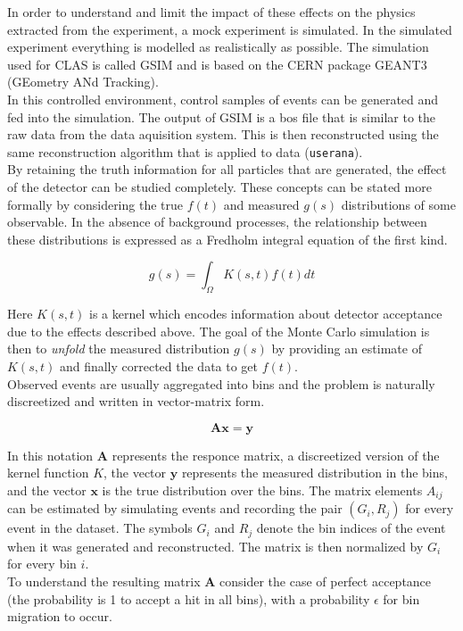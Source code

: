 In order to understand and limit the impact of these effects on the physics extracted from the experiment, a mock experiment is simulated.  In the simulated experiment everything is modelled as realistically as possible.  The simulation used for CLAS is called GSIM and is based on the CERN package GEANT3 (GEometry ANd Tracking).\\
In this controlled environment, control samples of events can be generated and fed into the simulation.  The output of GSIM is a bos file that is similar to the raw data from the data aquisition system. This is then reconstructed using the same reconstruction algorithm that is applied to data (\texttt{userana}).  \\ 
By retaining the truth information for all particles that are generated, the effect of the detector can be studied completely.  These concepts can be stated more formally by considering the true $f(t)$ and measured $g(s)$ distributions of some observable.  In the absence of background processes, the relationship between these distributions is expressed as a Fredholm integral equation of the first kind.

\begin{equation}
	g(s) = \int_{\Omega} K(s,t) f(t) dt
\end{equation}
    
Here $K(s,t)$ is a kernel which encodes information about detector acceptance due to the effects described above.  The goal of the Monte Carlo simulation is then to \textit{unfold} the measured distribution $g(s)$ by providing an estimate of $K(s,t)$ and finally corrected the data to get $f(t)$.\\
Observed events are usually aggregated into bins and the problem is naturally discreetized and written in vector-matrix form.

\begin{equation}
	\mathbf{A} \mathbf{x} = \mathbf{y}
\end{equation}        

In this notation $\mathbf{A}$ represents the responce matrix, a discreetized version of the kernel function $K$, the vector $\mathbf{y}$ represents the measured distribution in the bins, and the vector $\mathbf{x}$ is the true distribution over the bins.  The matrix elements $A_{ij}$ can be estimated by simulating events and recording the pair $(G_i,R_j)$ for every event in the dataset.  The symbols $G_i$ and $R_j$ denote the bin indices of the event when it was generated and reconstructed.  The matrix is then normalized by $G_i$ for every bin $i$.  \\
To understand the resulting matrix $\mathbf{A}$ consider the case of perfect acceptance (the probability is 1 to accept a hit in all bins), with a probability $\epsilon$ for bin migration to occur.

